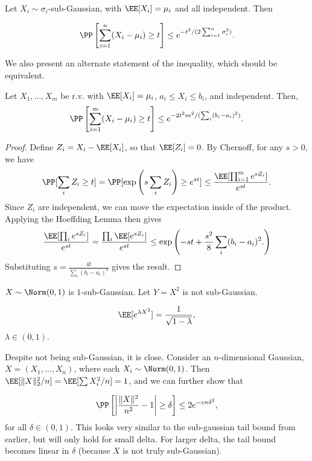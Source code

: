 \begin{theorem}

Let $X_i\sim \sigma_i$-sub-Gaussian, with $\EE[X_i]=\mu_i$ and all independent. Then

\[\PP\left[\sum_{i=1}^n (X_i-\mu_i)\geq t\right] \leq e^{-t^2 / (2\sum_{i=1}^n\sigma_i^2)}.\] 
\end{theorem}

We also present an alternate statement of the inequality, which should be equivalent. 

\begin{theorem}

Let $X_1,\hdots,X_m$ be r.v. with $\EE[X_i]=\mu_i$, $a_i\leq X_i\leq b_i$, and independent. Then, 
\[\PP\left[\sum_{i=1}^m(X_i-\mu_i)\geq t\right]\leq e^{-2t^2m^2/(\sum_i (b_i-a_i)^2)}.\] 
\end{theorem}

\begin{proof}
	Define $Z_i = X_i-\EE[X_i]$, so that $\EE[Z_i] = 0$. By Chernoff, for any $s>0$, we have 
	\[\PP[\sum_i Z_i\geq t] = \PP[\exp\left(s\sum_i Z_i\right)\geq e^{st}] \leq \frac{\EE[\prod_{i=1}^m e^{sZ_i}]}{e^{st}}.\] 
	Since $Z_i$ are independent, we can move the expectation inside of the product. Applying the Hoeffding Lemma then gives
	\[\frac{\EE[\prod_i e^{sZ_i}]}{e^{st}} = \frac{\prod_i \EE[e^{sZ_i}]}{e^{st}}\leq \exp\left(-st + \frac{s^2}{8}\sum_i (b_i-a_i)^2.\right)\] 
	Substituting $s = \frac{4t}{\sum_i (b_i-a_i)^2}$ gives the result.
\end{proof}
\begin{example}
\exlabel

$X\sim \Norm(0,1)$ is $1$-sub-Gaussian. Let $Y=X^2$ is not sub-Gaussian. 
\end{example}

\begin{align*}
	\EE[e^{\lambda X^2}] = \frac{1}{\sqrt{1-\lambda}},
\end{align*}
$\lambda\in (0,1)$.

Despite not being sub-Gaussian, it is close. Consider an $n$-dimensional Gaussian, $X = (X_1, \hdots, X_n)$, where each $X_i\sim \Norm(0,1)$. Then $\EE[\lVert X\rVert_2^2 / n] = \EE[\sum X_i^2 / n] = 1$, and we can further show that 

\[\PP\left[ \left\vert\frac{\lVert X\rVert^2}{n^2} - 1\right\vert \geq \delta\right] \leq 2e^{-cn\delta^2},\] 
for all $\delta\in (0,1)$. This looks very similar to the sub-gaussian tail bound from earlier, but will only hold for small delta. For larger delta, the tail bound becomes linear in $\delta$ (because $X$ is not truly sub-Gaussian).

